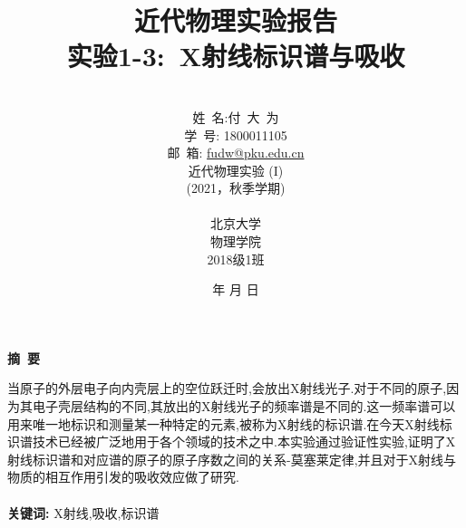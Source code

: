 \documentclass[a4paper]{article}
\begin{document}
\setlength{\abovecaptionskip}{0pt}
\setlength{\belowcaptionskip}{0pt}
\renewcommand{\contentsname}{目\ 录}
\renewcommand{\appendixname}{附录}
\renewcommand{\appendixpagename}{附录}
\renewcommand{\refname}{参考文献} 
\renewcommand{\figurename}{图}
\renewcommand{\tablename}{表}
\renewcommand{\today}{\number\year 年 \number\month 月 \number\day 日}
\renewcommand{\comma}{$\mkern -8.5mu\raise -.2ex\hbox{\rotatebox[]{180}{\`}}\ $}

\newcommand*{\circled}[1]{\lower.7ex\hbox{\tikz\draw (0pt, 0pt)%
    circle (.5em) node {\makebox[1em][c]{\small #1}};}}
\title{{\Huge 近代物理实验报告{\large\linebreak\\}}{\Large 实验1-3:\ X射线标识谱与吸收\linebreak\linebreak}}
\author{\\姓\ 名:付\ 大\ 为\\
学\ 号: 1800011105\\
邮\ 箱: \url{fudw@pku.edu.cn}\\
近代物理实验 (I)\\
(2021，秋季学期)\\\\
北京大学\\
物理学院\\
2018级1班}
\date{\today}
\maketitle
\newpage

\begin{center}
{\Large\bf{摘\ 要\\}}
\end{center}

当原子的外层电子向内壳层上的空位跃迁时,会放出X射线光子.对于不同的原子,因为其电子壳层结构的不同,其放出的X射线光子的频率谱是不同的.这一频率谱可以用来唯一地标识和测量某一种特定的元素,被称为X射线的标识谱.在今天X射线标识谱技术已经被广泛地用于各个领域的技术之中.本实验通过验证性实验,证明了X射线标识谱和对应谱的原子的原子序数之间的关系-莫塞莱定律,并且对于X射线与物质的相互作用引发的吸收效应做了研究.\\\\
{\bf{关键词}: }X射线,吸收,标识谱
\newpage
\end{document}
